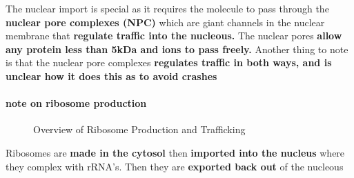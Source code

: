 \documentclass[../main.tex]{subfiles}
\begin{document}
The nuclear import is special as it requires the molecule to pass through the \textbf{nuclear pore complexes (\gls{NPC})} which are giant channels in the nuclear membrane that \textbf{regulate traffic into the nucleous.}  The nuclear pores \textbf{allow any protein less than 5kDa and ions to pass freely.} Another thing to note is that the nuclear pore complexes \textbf{regulates traffic in both ways, and is unclear how it does this as to avoid crashes}

\paragraph{note on ribosome production}

\begin{figure}[H]
\centering
{}
\caption{Overview of Ribosome Production and Trafficking}
\end{figure}
Ribosomes are \textbf{made in the cytosol} then \textbf{imported into the nucleus } where they complex with rRNA's. Then they are \textbf{exported back out} of the nucleous
\end{document}
